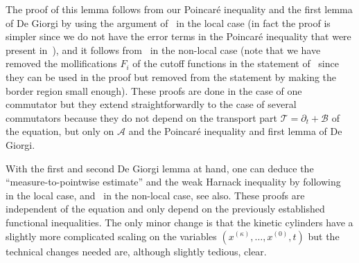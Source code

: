 \documentclass[JEP,XML,SOM,Unicode,NoFloatCountersInSection,published]{cedram}
\theoremstyle{definition}
\newcommand{\cA}{{\mathcal A}}
\newcommand{\cB}{{\mathcal B}}
\newcommand{\cT}{{\mathcal T}}
\begin{document}
The proof of this lemma follows from our Poincaré inequality
and the first lemma of De Giorgi by using the argument
of~\cite[\S 3.2]{guerand-mouhot} in the local case (in
fact the proof is simpler since we do not have the error terms in
the Poincaré inequality that were present
in~\cite{guerand-mouhot}), and it follows
from~\cite[\S 5.2]{loher-2022-preprint-quantitative-de-giorgi}
in the non-local case (note that we have removed the
mollifications $F_i$ of the cutoff functions in the statement
of~\cite{loher-2022-preprint-quantitative-de-giorgi} since they
can be used in the proof but removed from the statement by making the border region small
enough). These proofs are done in the case of one commutator but
they extend straightforwardly to the case of several commutators
because they do not depend on the transport part
$\cT = \partial_t + \cB$ of the equation, but only on $\cA$ and
the Poincaré inequality and first lemma of De Giorgi.

With the first and second De Giorgi lemma at hand, one can deduce
the ``measure-to-pointwise estimate'' and the weak Harnack
inequality by following~\cite{guerand-mouhot} in the local case,
and~\cite{loher-2022-preprint-quantitative-de-giorgi} in the
non-local case, see \cite{APP} also. These proofs are independent of the equation and
only depend on the previously established functional
inequalities. The only minor change is that the kinetic cylinders
have a slightly more complicated scaling on the variables
$(x^{(\kappa)},\dots,x^{(0)},t)$ but the technical changes needed
are, although slightly tedious, clear.

\backmatter


\end{document}
